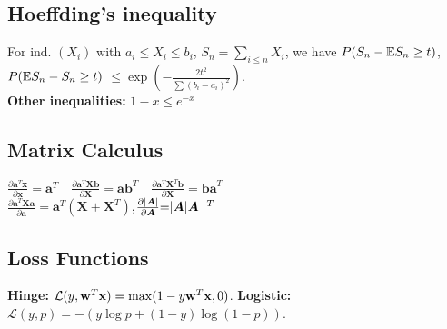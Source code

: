 \subsection*{Hoeffding's inequality}
For ind. $(X_i)$ with $a_i\leq X_i\leq b_i$, $S_n=\sum_{i\leq n}X_i$, we have $P(S_n-\mathbb{E} S_n\geq t)$, $P(\mathbb{E} S_n - S_n \geq t)$ $\leq \exp(-\frac{2t^2}{\sum(b_i-a_i)^2})$.\\

\textbf{Other inequalities:} $1-x \leq e^{-x}$\quad

\subsection*{Matrix Calculus}
$\frac{\partial \mathbf{a}^T\mathbf{x}}{\partial\mathbf{x}}{=}\mathbf{a}^T \quad \frac{\partial \mathbf{a}^T\mathbf{Xb}}{\partial\mathbf{X}}{=}\mathbf{ab}^T \quad \frac{\partial \mathbf{a}^T\mathbf{X}^T\mathbf{b}}{\partial\mathbf{X}}{=}\mathbf{ba}^T $\\
$\frac{\partial \mathbf{a}^T\mathbf{Xa}}{\partial\mathbf{a}}{=}\mathbf{a}^T(\mathbf{X}+\mathbf{X}^T)$,$\frac{\partial |{\bm{A}}|}{\partial {\bm{A}}}{=}|{\bm{A}}|{\bm{A}}^{-T}$\\

\subsection*{Loss Functions}
\textbf{Hinge:} $\mathcal{L}(y,{\mathbf{w}}^T{\mathbf{x}}) = \max(1-y{\mathbf{w}}^T{\mathbf{x}}, 0)$.
\textbf{Logistic:} $\mathcal{L}(y,p) = -(y\log p + (1-y)\log (1-p))$.




